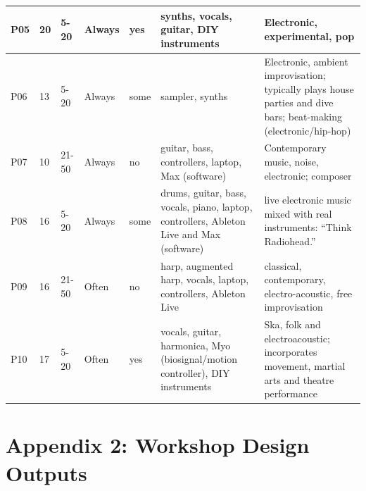 \documentclass[letterpaper, 12pt]{article}
\begin{document}
\begin{spacing}{1.1}
\begin{longtable}{ C{0.6cm} C{1.1cm} C{1.3cm} C{1.3cm} C{1.3cm} L{3.2cm} L{4.6cm} }
        P05 &
        20 &
        5-20 &
        Always &
        yes &
        synths, vocals, guitar, DIY instruments &
        Electronic, experimental, pop \\ \hline
        
        P06 &
        13 &
        5-20 &
        Always &
        some &
        sampler, synths &
        Electronic, ambient improvisation; typically plays house parties and dive bars; beat-making (electronic/hip-hop) \\ \hline
        
        P07 &
        10 &
        21-50 &
        Always &
        no &
        guitar, bass, controllers, laptop, Max (software) &
        Contemporary music, noise, electronic; composer \\ \hline
        
        P08 &
        16 &
        5-20 &
        Always &
        some &
        drums, guitar, bass, vocals, piano, laptop, controllers, Ableton Live and Max (software) &
        live electronic music mixed with real instruments: ``Think Radiohead.'' \\ \hline
        
        P09 &
        16 &
        21-50 &
        Often &
        no &
        harp, augmented harp, vocals, laptop, controllers, Ableton Live &
        classical, contemporary, electro-acoustic, free improvisation \\ \hline
        
        P10 &
        17 &
        5-20 &
        Often &
        yes &
        vocals, guitar, harmonica, Myo (biosignal/motion controller), DIY instruments &
        Ska, folk and electroacoustic; incorporates movement, martial arts and theatre performance \\ \hline
    \end{longtable}
\end{spacing}

\section*{Appendix 2: Workshop Design Outputs}
\end{document}

